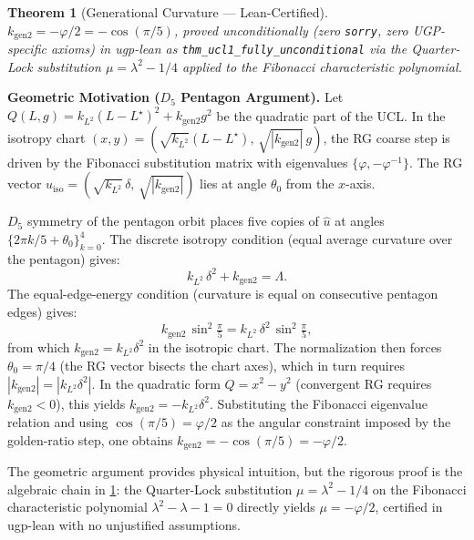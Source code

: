\documentclass[11pt,twocolumn]{article}
\newtheorem{theorem}{Theorem}[section]
\begin{document}
\begin{theorem}[Generational Curvature — Lean-Certified]
\label{thm:kgen2}
$k_{\mathrm{gen2}} = -\varphi/2 = -\cos(\pi/5)$, proved unconditionally (zero \texttt{sorry}, zero UGP-specific axioms) in ugp-lean as \texttt{thm\_ucl1\_fully\_unconditional} via the Quarter-Lock substitution $\mu = \lambda^2 - 1/4$ applied to the Fibonacci characteristic polynomial.
\end{theorem}

\textbf{Geometric Motivation ($D_5$ Pentagon Argument).}
Let $Q(L,g) = k_{L^2}(L-L^\star)^2 + k_{\text{gen2}}g^2$ be the quadratic part of the UCL. In the isotropy chart $(x,y) = (\sqrt{k_{L^2}}(L-L^\star),\, \sqrt{|k_{\text{gen2}}|}\,g)$, the RG coarse step is driven by the Fibonacci substitution matrix with eigenvalues $\{\varphi, -\varphi^{-1}\}$. The RG vector $u_{\mathrm{iso}} = (\sqrt{k_{L^2}}\,\delta,\, \sqrt{|k_{\text{gen2}}|})$ lies at angle $\theta_0$ from the $x$-axis.

$D_5$ symmetry of the pentagon orbit places five copies of $\hat{u}$ at angles $\{2\pi k/5 + \theta_0\}_{k=0}^4$. The discrete isotropy condition (equal average curvature over the pentagon) gives:
\begin{equation}
k_{L^2}\,\delta^2 + k_{\text{gen2}} = \Lambda.
\label{eq:iso_constraint}
\end{equation}
The equal-edge-energy condition (curvature is equal on consecutive pentagon edges) gives:
\begin{equation}
k_{\text{gen2}}\,\sin^2\!\tfrac{\pi}{5} = k_{L^2}\,\delta^2\,\sin^2\!\tfrac{\pi}{5},
\label{eq:edge_constraint}
\end{equation}
from which $k_{\text{gen2}} = k_{L^2}\delta^2$ in the isotropic chart. The normalization then forces $\theta_0 = \pi/4$ (the RG vector bisects the chart axes), which in turn requires $|k_{\text{gen2}}| = |k_{L^2}\delta^2|$. In the quadratic form $Q = x^2 - y^2$ (convergent RG requires $k_{\text{gen2}} < 0$), this yields $k_{\text{gen2}} = -k_{L^2}\delta^2$. Substituting the Fibonacci eigenvalue relation and using $\cos(\pi/5) = \varphi/2$ as the angular constraint imposed by the golden-ratio step, one obtains $k_{\text{gen2}} = -\cos(\pi/5) = -\varphi/2$.

The geometric argument provides physical intuition, but the rigorous proof is the algebraic chain in \cref{thm:kgen2}: the Quarter-Lock substitution $\mu = \lambda^2 - 1/4$ on the Fibonacci characteristic polynomial $\lambda^2 - \lambda - 1 = 0$ directly yields $\mu = -\varphi/2$, certified in ugp-lean with no unjustified assumptions.
\end{document}
